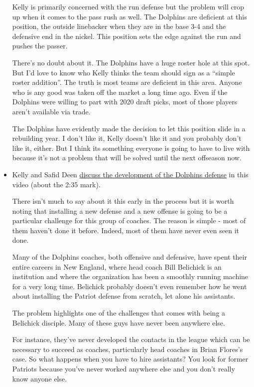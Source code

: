 \documentclass[11pt]{article}
\begin{document}
\begin{itemize}
Kelly is primarily concerned with the run defense but the problem will crop up when it comes to the pass rush as well.  The Dolphins are deficient at this position, the outside linebacker when they are in the base 3-4 and the defensive end in the nickel.  This position sets the edge against the run and pushes the passer.

There's no doubt about it.  The Dolphins have a huge roster hole at this spot.  But I'd love to know who Kelly thinks the team should sign as a ``simple roster addition''.  The truth is most teams are deficient in this area.  Anyone who is any good was taken off the market a long time ago.  Even if the Dolphins were willing to part with 2020 draft picks, most of those players aren't available via trade.

The Dolphins have evidently made the decision to let this position slide in a rebuilding year.  I don't like it, Kelly doesn't like it and you probably don't like it, either.  But I think its something everyone is going to have to live with because it's not a problem that will be solved until the next offseason now.

\item Kelly and Safid Deen \href{https://www.sun-sentinel.com/dddc3139-323a-477a-84b2-550540d9d5e2-132.html}{discuss the development of the Dolphins defense} in this video (about the 2:35 mark).

There isn't much to say about it this early in the process but it is worth noting that installing a new defense and a new offense is going to be a particular challenge for this group of coaches.  The reason is simple - most of them haven't done it before.  Indeed, most of them have never even seen it done.

Many of the Dolphins coaches, both offensive and defensive, have spent their entire careers in New England, where head coach Bill Belichick is an institution and where the organization has been a smoothly running machine for a very long time.  Belichick probably doesn't even remember how he went about installing the Patriot defense from scratch, let alone his assistants.

The problem highlights one of the challenges that comes with being a Belichick disciple.  Many of these guys have never been anywhere else.

For instance, they've never developed the contacts in the league which can be necessary to succeed as coaches, particularly head coaches in Brian Flores's case.  So what happens when you have to hire assistants?  You look for former Patriots because you've never worked anywhere else and you don't really know anyone else.


\end{itemize}
\end{document}
